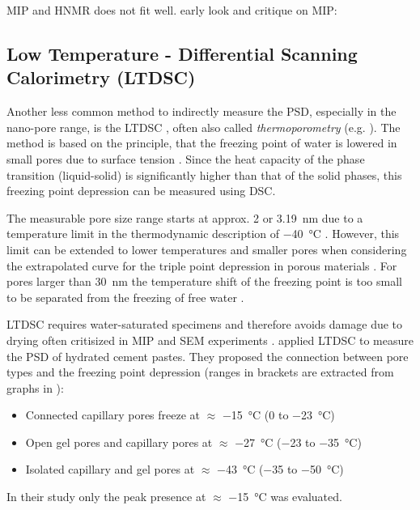 {\color{red}
\ac{MIP} and \ac{HNMR} does not fit well.
\cite{tziotziou.2011}
early look and critique on MIP: \cite{juntgen.1966}
}


\FloatBarrier
\subsection{Low Temperature - Differential Scanning Calorimetry (\acs{LTDSC})}
\label{sec:ltdsc}

Another less common method to indirectly measure the \ac{PSD}, especially in the nano-pore range, is the \ac{LTDSC} \cite{brun.1973,brun.1977}, often also called \textit{thermoporometry} (e.g. \cite{joseph.2024}).
The method is based on the principle, that the freezing point of water is lowered in small pores due to surface tension \cite{brun.1973,brun.1977}.
Since the heat capacity of the phase transition (liquid-solid) is significantly higher than that of the solid phases, this freezing point depression can be measured using \ac{DSC}.

The measurable pore size range starts at approx. \num{2} \cite{cuperus.1992} or \SI{3.19}{\nano\meter} due to a temperature limit in the thermodynamic description of \SI{-40}{\degreeCelsius} \cite{brun.1977}.
However, this limit can be extended to lower temperatures and smaller pores when considering the extrapolated curve for the triple point depression in porous materials \cite{kloetstra.1995}.
For pores larger than \SI{30}{\nano\meter} the temperature shift of the freezing point is too small to be separated from the freezing of free water \cite{cuperus.1992,stocker.2002}.

\ac{LTDSC} requires water-saturated specimens and therefore avoids damage due to drying \cite{gran.1997,galle.2001} often critisized in \ac{MIP} and \ac{SEM} experiments \cite{chatterji.2001,georget.2024}.
\textcite{sant.2011} applied \ac{LTDSC} to measure the \ac{PSD} of hydrated cement pastes.
They proposed the connection between pore types and the freezing point depression (ranges in brackets are extracted from graphs in \cite{sant.2011}):
\begin{itemize}
    \item Connected capillary pores freeze at $\approx$ \SI{-15}{\degreeCelsius} (\num{0} to \SI{-23}{\degreeCelsius})
    \item Open gel pores and capillary pores at $\approx$ \SI{-27}{\degreeCelsius} (\num{-23} to \SI{-35}{\degreeCelsius})
    \item Isolated capillary and gel pores at $\approx$ \SI{-43}{\degreeCelsius} (\num{-35} to \SI{-50}{\degreeCelsius})
\end{itemize}
In their study only the peak presence at $\approx$ \SI{-15}{\degreeCelsius} was evaluated.

